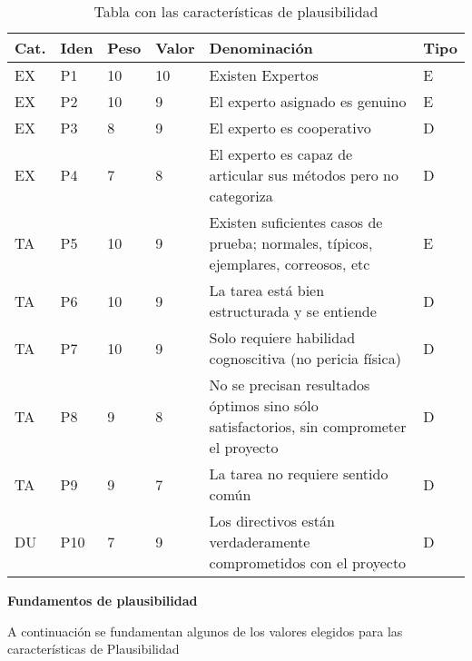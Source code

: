 \begin{table}[htb]%
  \centering
  \caption{Tabla con las características de plausibilidad}
  \label{tab:anchura}
  \begin{tabular}{ | l | l | l | l | p{8cm} | l | }
    \hline
    Cat. & Iden & Peso & Valor & Denominación & Tipo \\ \hline
    EX & P1 & 10 & 10 & Existen Expertos & E \\ \hline
    EX & P2 &  10 & 9 & El experto asignado es genuino & E \\ \hline
    EX & P3 & 8 & 9 & El experto es cooperativo & D \\ \hline
    EX & P4 & 7 & 8 & El experto es capaz de articular sus métodos pero no categoriza & D \\ \hline
    TA & P5 & 10 & 9 & Existen suficientes casos de prueba; normales, típicos, ejemplares, correosos, etc & E \\ \hline
    TA & P6 & 10 & 9 & La tarea está bien estructurada y se entiende & D \\ \hline
    TA & P7 & 10 & 9 & Solo requiere habilidad cognoscitiva (no pericia física) & D \\ \hline
    TA & P8 & 9 & 8 & No se precisan resultados óptimos sino sólo satisfactorios, sin comprometer el proyecto & D \\ \hline
    TA & P9 & 9 & 7 & La tarea no requiere sentido común & D \\ \hline
    DU & P10 & 7 & 9 & Los directivos están verdaderamente comprometidos con el proyecto & D \\ \hline
  \end{tabular}
\end{table}

\newpage

\textbf{Fundamentos de plausibilidad}

A continuación se fundamentan algunos de los valores elegidos para las características de Plausibilidad


